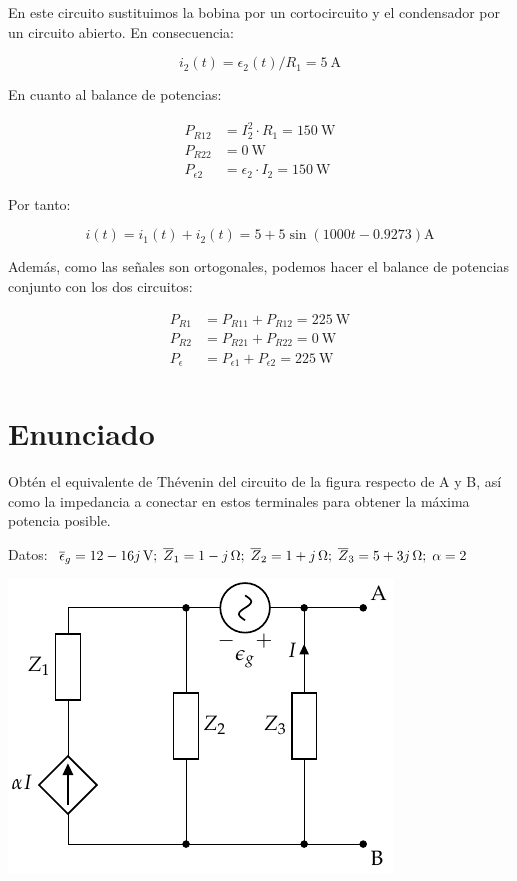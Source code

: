En este circuito sustituimos la bobina por un cortocircuito y el condensador por un circuito abierto. En consecuencia:

\begin{equation*}
  i_2(t) = \epsilon_2(t) / R_1 = \qty{5}{\ampere}
\end{equation*}

En cuanto al balance de potencias:

\begin{align*}
  P_{R12} &= I_2^2 \cdot R_1 = \qty{150}{\watt}\\
  P_{R22} &= \qty{0}{\watt}\\
  P_{\epsilon2} &= \epsilon_2 \cdot I_2 = \qty{150}{\watt}
\end{align*}

Por tanto:

\begin{equation*}
  i(t) = i_1(t) + i_2(t) = 5 + 5\sin(1000t - 0.9273)\si{\ampere}
\end{equation*}

Además, como las señales son ortogonales, podemos hacer el balance de potencias conjunto con los dos circuitos:

\begin{align*}
  P_{R1} &= P_{R11} + P_{R12} = \qty{225}{\watt}\\
  P_{R2} &= P_{R21} + P_{R22} = \qty{0}{\watt}\\
  P_{\epsilon} &= P_{\epsilon1} + P_{\epsilon2} = \qty{225}{\watt}\\
\end{align*}
\section{Enunciado}
Obtén el equivalente de Thévenin del circuito de la figura
  respecto de A y B, así como la impedancia a conectar en estos terminales para obtener la máxima potencia posible.

\vspace{3mm}
Datos: $\; \overline{\epsilon}_g = \qty[parse-numbers=false]{12 - 16j}{\volt};\;
  \overline{Z}_1 = \qty[parse-numbers=false]{1 - j}{\ohm};\;
  \overline{Z}_2 = \qty[parse-numbers=false]{1 + j}{\ohm};\;
  \overline{Z}_3 = \qty[parse-numbers=false]{5 + 3j}{\ohm};\;
  \alpha = 2 $

\begin{center}
\includegraphics{figuras/Thevenin4}
\end{center}


